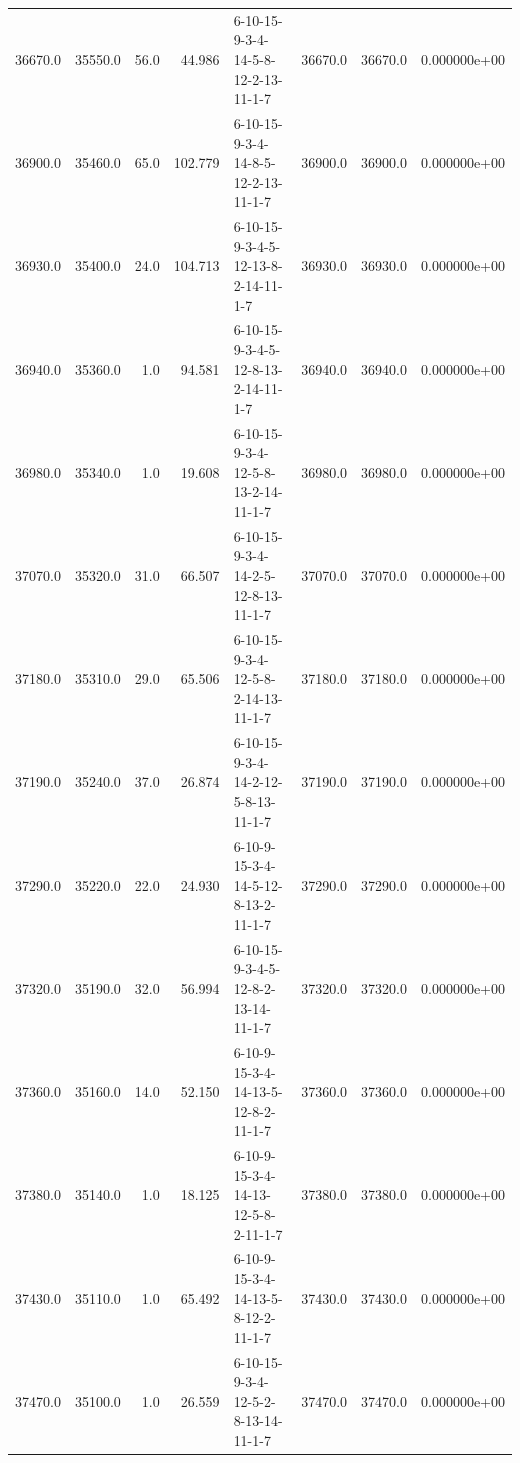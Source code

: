 \begin{tabular}{rrrrlrrr}
 36670.0 &  35550.0 &           56.0 &             44.986 &  6-10-15-9-3-4-14-5-8-12-2-13-11-1-7 &       36670.0 &         36670.0 &  0.000000e+00 \\
 36900.0 &  35460.0 &           65.0 &            102.779 &  6-10-15-9-3-4-14-8-5-12-2-13-11-1-7 &       36900.0 &         36900.0 &  0.000000e+00 \\
 36930.0 &  35400.0 &           24.0 &            104.713 &  6-10-15-9-3-4-5-12-13-8-2-14-11-1-7 &       36930.0 &         36930.0 &  0.000000e+00 \\
 36940.0 &  35360.0 &            1.0 &             94.581 &  6-10-15-9-3-4-5-12-8-13-2-14-11-1-7 &       36940.0 &         36940.0 &  0.000000e+00 \\
 36980.0 &  35340.0 &            1.0 &             19.608 &  6-10-15-9-3-4-12-5-8-13-2-14-11-1-7 &       36980.0 &         36980.0 &  0.000000e+00 \\
 37070.0 &  35320.0 &           31.0 &             66.507 &  6-10-15-9-3-4-14-2-5-12-8-13-11-1-7 &       37070.0 &         37070.0 &  0.000000e+00 \\
 37180.0 &  35310.0 &           29.0 &             65.506 &  6-10-15-9-3-4-12-5-8-2-14-13-11-1-7 &       37180.0 &         37180.0 &  0.000000e+00 \\
 37190.0 &  35240.0 &           37.0 &             26.874 &  6-10-15-9-3-4-14-2-12-5-8-13-11-1-7 &       37190.0 &         37190.0 &  0.000000e+00 \\
 37290.0 &  35220.0 &           22.0 &             24.930 &  6-10-9-15-3-4-14-5-12-8-13-2-11-1-7 &       37290.0 &         37290.0 &  0.000000e+00 \\
 37320.0 &  35190.0 &           32.0 &             56.994 &  6-10-15-9-3-4-5-12-8-2-13-14-11-1-7 &       37320.0 &         37320.0 &  0.000000e+00 \\
 37360.0 &  35160.0 &           14.0 &             52.150 &  6-10-9-15-3-4-14-13-5-12-8-2-11-1-7 &       37360.0 &         37360.0 &  0.000000e+00 \\
 37380.0 &  35140.0 &            1.0 &             18.125 &  6-10-9-15-3-4-14-13-12-5-8-2-11-1-7 &       37380.0 &         37380.0 &  0.000000e+00 \\
 37430.0 &  35110.0 &            1.0 &             65.492 &  6-10-9-15-3-4-14-13-5-8-12-2-11-1-7 &       37430.0 &         37430.0 &  0.000000e+00 \\
 37470.0 &  35100.0 &            1.0 &             26.559 &  6-10-15-9-3-4-12-5-2-8-13-14-11-1-7 &       37470.0 &         37470.0 &  0.000000e+00 \\

\end{tabular}

